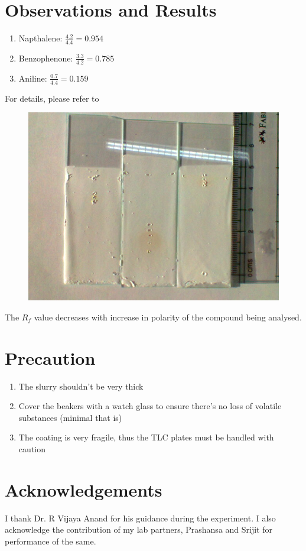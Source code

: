 \section{Observations and Results}
	\begin{enumerate}
		\item Napthalene: $\frac {4.2} {4.4} = 0.954$
		\item Benzophenone: $\frac {3.3} {4.2} = 0.785$
		\item Aniline: $\frac {0.7} {4.4} = 0.159$
	\end{enumerate}
	For details, please refer to 

	\begin{figure}[bth]
		\begin{center}
			\includegraphics[width=1.2\linewidth]{gfx/e1_1}
		\end{center}
	\caption[TLC plates after Iodine visibility treatment]{\label{1A_slides}}
	\end{figure}


	The $R_f$ value decreases with increase in polarity of the compound being analysed.
\section{Precaution}
	\begin{enumerate}
		\item The slurry shouldn't be very thick
		\item Cover the beakers with a watch glass to ensure there's no loss of volatile substances (minimal that is)
		\item The coating is very fragile, thus the TLC plates must be handled with caution
	\end{enumerate}	
\section{Acknowledgements}
I thank Dr. R Vijaya Anand for his guidance during the experiment. I also acknowledge the contribution of my lab partners, Prashansa and Srijit for performance of the same.